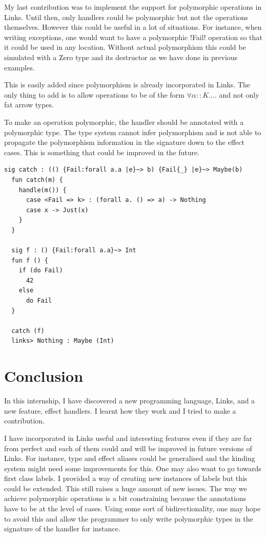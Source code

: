 \documentclass[11pt, nonacm=true, language=french, language=english]{acmart}
\begin{document}
My last contribution was to implement the support for polymorphic operations in Links. Until then, only handlers could be polymorphic but not the operations themselves. However this could be useful in a lot of situations. For instance, when writing exceptions, one would want to have a polymorphic !Fail! operation so that it could be used in any location. Without actual polymorphism this could be simulated with a Zero type and its destructor as we have done in previous examples.

This is easily added since polymorphism is already incorporated in Links. The only thing to add is to allow operations to be of the form $\forall \alpha ::K. \dots$ and not only fat arrow types.

To make an operation polymorphic, the handler should be annotated with a polymorphic type. The type system cannot infer polymorphism and is not able to propagate the polymorphism information in the signature down to the effect cases. This is something that could be improved in the future.

\begin{lstlisting}[caption=Polymorphism example]
  sig catch : (() {Fail:forall a.a |e}~> b) {Fail{_} |e}~> Maybe(b)
  fun catch(m) {
    handle(m()) {
      case <Fail => k> : (forall a. () => a) -> Nothing
      case x -> Just(x)
    }
  }

  sig f : () {Fail:forall a.a}~> Int
  fun f () {
    if (do Fail)
      42
    else
      do Fail
  }

  catch (f)
  links> Nothing : Maybe (Int)
\end{lstlisting}



\section{Conclusion}
\label{sec:conclusion}

In this internship, I have discovered a new programming language, Links, and a new feature, effect handlers. I learnt how they work and I tried to make a contribution.

I have incorporated in Links useful and interesting features even if they are far from perfect and each of them could and will be improved in future versions of Links. For instance, type and effect aliases could be generalised and the kinding system might need some improvements for this. One may also want to go towards first class labels. I provided a way of creating new instances of labels but this could be extended. This still raises a huge amount of new issues. The way we achieve polymorphic operations is a bit constraining because the annotations have to be at the level of cases. Using some sort of bidirectionality, one may hope to avoid this and allow the programmer to only write polymorphic types in the signature of the handler for instance.
\end{document}
